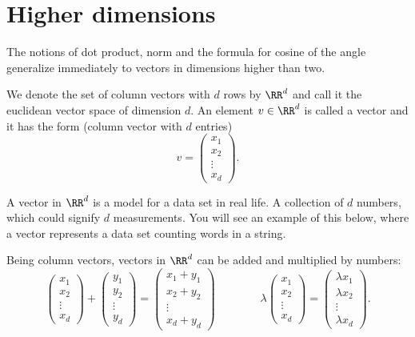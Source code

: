 \documentclass{article}
\begin{document}
\section{Higher dimensions}

The notions of dot product, norm and the formula for cosine of the
angle generalize immediately to vectors in dimensions
higher than two.

We denote the set of column vectors with $d$ rows
by $\RR^d$ and call it the euclidean vector space of
dimension $d$. An element $v\in \RR^d$ is called a vector and it has
the form (column vector with $d$ entries)
$$
v =
\begin{pmatrix}
  x_1 \\
  x_2 \\
  \vdots
  \\
  x_d
\end{pmatrix}.
$$

A vector in $\RR^d$ is a model for a data set in real life. A collection
of $d$ numbers, which could signify $d$ measurements. You will see
an example of this below, where a vector represents a data set
counting words in a string.

Being column vectors, vectors in $\RR^d$ can be added and multiplied by
numbers:
$$
\begin{pmatrix}
  x_1 \\
  x_2 \\
  \vdots
  \\
  x_d
\end{pmatrix} + 
\begin{pmatrix}
  y_1 \\
  y_2 \\
  \vdots
  \\
  y_d
\end{pmatrix}
=
\begin{pmatrix}
  x_1 + y_1 \\
  x_2 + y_2\\
  \vdots
  \\
  x_d + y_d
\end{pmatrix}\qquad\qquad
\lambda
\begin{pmatrix}
  x_1 \\
  x_2 \\
  \vdots
  \\
  x_d
\end{pmatrix} =
\begin{pmatrix}
  \lambda x_1 \\
  \lambda x_2 \\
  \vdots
  \\
  \lambda x_d
\end{pmatrix}.
$$
\end{document}
